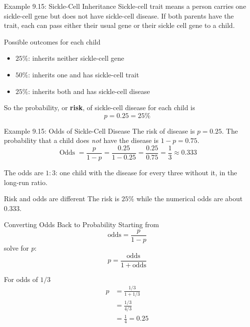 \documentclass[aspectratio=169]{beamer}
\begin{document}
\begin{frame}{Example 9.15: Sickle-Cell Inheritance}
Sickle-cell trait means a person carries one sickle-cell gene but does not have sickle-cell disease. If both parents have the trait, each can pass either their usual gene or their sickle cell gene to a child.
\begin{block}{Possible outcomes for each child}
\begin{itemize}
  \item $25\%$: inherits neither sickle-cell gene
  \item $50\%$: inherits one and has sickle-cell trait
  \item $25\%$: inherits both and has sickle-cell disease
\end{itemize}
\end{block}

So the probability, or \textbf{risk}, of sickle-cell disease for each child is
$$p=0.25=25\%$$
\end{frame}

\begin{frame}{Example 9.15: Odds of Sickle-Cell Disease}
The risk of disease is $p=0.25$. The probability that a child does \emph{not} have the disease is $1-p=0.75$.
$$\operatorname{Odds}=\frac{p}{1-p}=\frac{0.25}{1-0.25}=\frac{0.25}{0.75} =\frac{1}{3}\approx 0.333$$

\vspace{1cm}

The odds are \textbf{$1:3$}: one child with the disease for every three without it, in the long-run ratio.
\begin{alertblock}{Risk and odds are different}
The risk is $25\%$ while the numerical odds are about $0.333$.
\end{alertblock}
\end{frame}

\begin{frame}{Converting Odds Back to Probability}
Starting from
$$\text{odds}=\frac{p}{1-p}$$
solve for $p$:
$$\boxed{p=\frac{\text{odds}}{1+\text{odds}}}$$

For odds of $1/3$
\begin{align*}
p
&=\frac{1/3}{1+1/3}\\
&=\frac{1/3}{4/3}\\
&=\frac14=0.25
\end{align*}
\end{frame}
\end{document}
